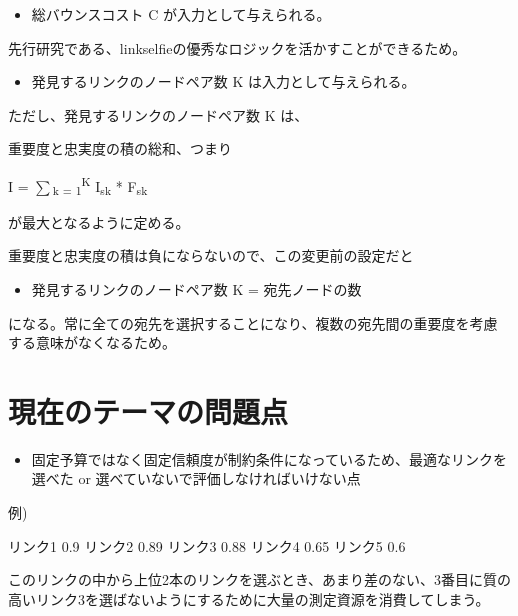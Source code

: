 \documentclass[conference]{IEEEtran}
\newenvironment{raddblock}{\color{red}}{}
\newenvironment{rdelblock}{\color{gray}}{}
\begin{document}
\begin{rdelblock}
\begin{itemize}
\item 総バウンスコスト C が入力として与えられる。
\end{itemize}
\end{rdelblock}


先行研究である、linkselfieの優秀なロジックを活かすことができるため。

\begin{raddblock}
\begin{itemize}
\item 発見するリンクのノードペア数 K は入力として与えられる。
\end{itemize}
\end{raddblock}
\begin{rdelblock}
ただし、発見するリンクのノードペア数 K は、

重要度と忠実度の積の総和、つまり

I = \(\sum\)\textsubscript{k = 1}\textsuperscript{K} I\textsubscript{s}\textsubscript{k} * F\textsubscript{s}\textsubscript{k} 

が最大となるように定める。
\end{rdelblock}


重要度と忠実度の積は負にならないので、この変更前の設定だと

\begin{itemize}
\item 発見するリンクのノードペア数 K = 宛先ノードの数
\end{itemize}

になる。常に全ての宛先を選択することになり、複数の宛先間の重要度を考慮
する意味がなくなるため。



\section{現在のテーマの問題点}
\label{sec:orgdf7aedc}
\begin{itemize}
\item 固定予算ではなく固定信頼度が制約条件になっているため、最適なリンクを
選べた or 選べていないで評価しなければいけない点
\end{itemize}


例)

リンク1 0.9
リンク2 0.89
リンク3 0.88
リンク4 0.65
リンク5 0.6

このリンクの中から上位2本のリンクを選ぶとき、あまり差のない、3番目に質の
高いリンク3を選ばないようにするために大量の測定資源を消費してしまう。
\end{document}

